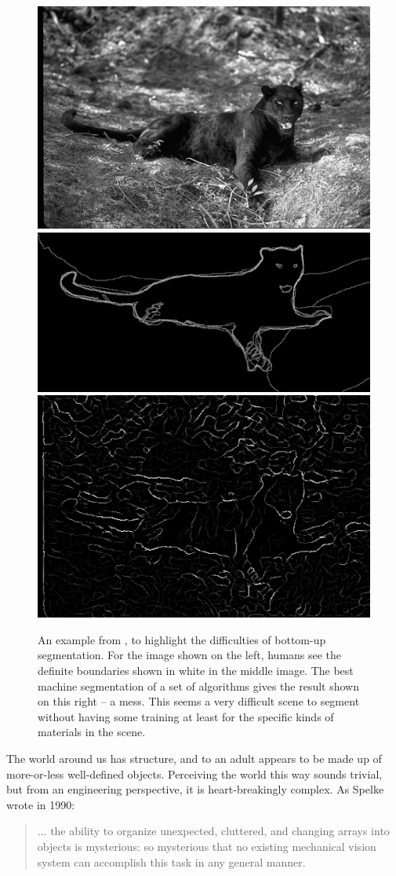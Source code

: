 
\begin{figure}[t]

\centerline{
\includegraphics[width=0.3\columnwidth]{cat}
\includegraphics[width=0.3\columnwidth]{cat-human}
\includegraphics[width=0.3\columnwidth]{cat-machine}
}

\caption[Object segregation is difficult for machines]{
%
\ifcapped
%
An example from , to highlight
the difficulties of bottom-up segmentation.
For the image shown on the left, humans see the definite boundaries
shown in white in the middle image.
The best machine segmentation of a set of algorithms gives the
result shown on this right -- a mess.  This seems a very difficult 
scene to segment without having some training at least for the specific 
kinds of materials in the scene.
%
\fi
%
}

\label{fig:segmentation-is-hard}

\end{figure}




The world around us has structure, and to an adult appears to be made
up of more-or-less well-defined objects.  
%
Perceiving the world this way sounds trivial, but from an engineering
perspective, it is heart-breakingly complex.  As Spelke wrote in 1990:

\begin{quote}

... the ability to organize unexpected, cluttered, and
changing arrays into objects is mysterious: so mysterious
that no existing mechanical vision system can accomplish this task
in any general manner.
\cite{spelke90principles}

\end{quote}

